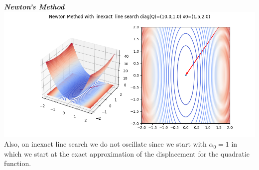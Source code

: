 \documentclass[12pt]{article}
\begin{document}
\begin{enumerate}
\newpage
\textbf{\textit{Newton’s Method}}\\
\includegraphics[scale=0.5]{hw2/plots/nm_inexact_6_elipse.png}\\
Also, on inexact line search we do not oscillate since we start with $\alpha_0=1$ in which we start at the exact approximation of the displacement for the quadratic function.\\

\end{enumerate}
\end{document}
